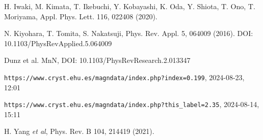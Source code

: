 \documentclass[prb,showpacs,amsmath,amssymb,superscriptaddress,twocolumn,floatfix]{revtex4-1}
\begin{document}
\begin{thebibliography}{99}
 H. Iwaki, M. Kimata, T. Ikebuchi, Y. Kobayashi, K. Oda, Y. Shiota, T. Ono, T. Moriyama,  Appl. Phys. Lett. 116, 022408 (2020). %

 N. Kiyohara, T. Tomita, S. Nakatsuji, Phys. Rev. Appl. 5, 064009 (2016). DOI: 10.1103/PhysRevApplied.5.064009

 Dunz et al. MnN, DOI: 10.1103/PhysRevResearch.2.013347

\texttt{https://www.cryst.ehu.es/magndata/index.php?index=0.199}, 2024-08-23, 12:01

 \texttt{https://www.cryst.ehu.es/magndata/index.php?this\_label=2.35}, 2024-08-14, 15:11

 H. Yang \textit{et al}, Phys. Rev. B 104, 214419 (2021).
    
\end{thebibliography}
\end{document}
